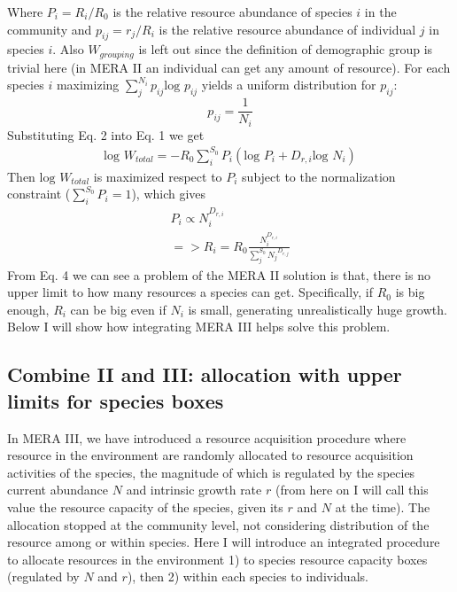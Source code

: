 \documentclass[12pt]{article}
\begin{document}
Where $P_i = R_i/R_0$ is the relative resource abundance of species $i$ in the community and $p_{ij}= r_j/R_i$ is the relative resource abundance of individual $j$ in species $i$.  Also $W_{grouping}$ is left out since the definition of demographic group is trivial here (in MERA II an individual can get any amount of resource). For each species $i$ maximizing $\sum^{N_i}_j p_{ij} \mbox{log } p_{ij}$ yields a uniform distribution for $p_{ij}$:
 \begin{equation}
p_{ij} = \frac{1}{N_i}
\end{equation}
Substituting Eq. 2 into Eq. 1 we get
 \begin{equation}
 \begin{split}
 \mbox{log }W_{total} =  - R_{0}\sum^{S_0}_i P_i (\mbox{log } P_i + D_{r,i} \mbox{log } N_i)
\end{split}
\end{equation}
 Then $ \mbox{log }W_{total}$ is maximized respect to $P_i$ subject to the normalization constraint ($\sum^{S_0}_i P_i = 1$), which gives
  \begin{equation}
 \begin{split}
 P_i \propto N_i^{D_{r,i}}\\
 =>  R_i = R_0 \frac{N_i^{D_{r,i}}}{\sum^{S_0}_j {N_j}^{D_{r,j}}}
\end{split}
\end{equation}
From Eq. 4 we can see a problem of the MERA II solution is that, there is no upper limit to how many resources a species can get. Specifically, if $R_0$ is big enough, $R_i$ can be big even if $N_i$ is small, generating unrealistically huge growth. Below I will show how integrating MERA III helps solve this problem.

\subsection{Combine II and III: allocation with upper limits for species boxes}
In MERA III, we have introduced a resource acquisition procedure where resource in the environment are randomly allocated to resource acquisition activities of the species, the magnitude of which is regulated by the species current abundance $N$ and intrinsic growth rate $r$ (from here on I will call this value the resource capacity of the species, given its $r$ and $N$ at the time). The allocation stopped at the community level, not considering distribution of the resource among or within species. Here I will introduce an integrated procedure to allocate resources in the environment 1) to species resource capacity boxes (regulated by $N$ and $r$), then 2) within each species to individuals. 
\end{document}
